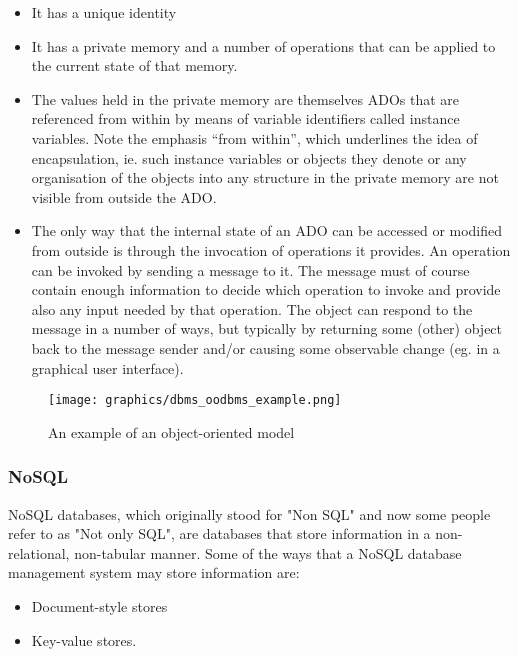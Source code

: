 \documentclass[letterpaper, 12pt]{article}
\begin{document}
\begin{itemize}
  \item It has a unique identity
  \item It has a private memory and a number of operations that can be applied to the current state of that memory. 
  \item The values held in the private memory are themselves ADOs that are referenced from
within by means of variable identifiers called instance variables. Note the emphasis
“from within”, which underlines the idea of encapsulation, ie. such instance variables
or objects they denote or any organisation of the objects into any structure in the
private memory are not visible from outside the ADO.
  \item The only way that the internal state of an ADO can be accessed or modified from
outside is through the invocation of operations it provides. An operation can be
invoked by sending a message to it. The message must of course contain enough
information to decide which operation to invoke and provide also any input needed
by that operation. The object can respond to the message in a number of ways, but
typically by returning some (other) object back to the message sender and/or causing
some observable change (eg. in a graphical user interface).
\end{itemize} \cite{object_oriented_data_model}

\begin{figure}
  \centering
  \texttt{[image: graphics/dbms\_oodbms\_example.png]}
  \caption{An example of an object-oriented model}
\end{figure}

\subsubsection{NoSQL}
NoSQL databases, which originally stood for "Non SQL" and now some people refer to as 
"Not only SQL", are databases that store information in a non-relational, non-tabular
manner. Some of the ways that a NoSQL database management system may store information are: 

\begin{itemize}
  \item Document-style stores
  \item Key-value stores.
\end{itemize}
\end{document}
